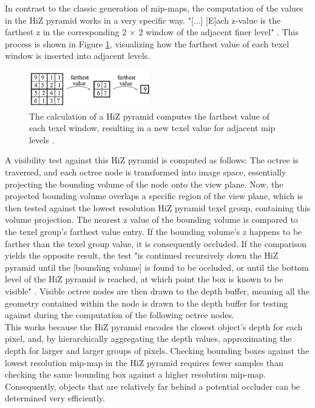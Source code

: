 \noindent
In contrast to the classic generation of mip-maps, the computation of the values in the \ac{HiZ} pyramid works in a 
very specific way. "[...] [E]ach z-value is the farthest z in the corresponding 2 \begin{math}\times\end{math} 2 window 
of the adjacent finer level" \cite{AkenineMoeller2018}. This process is shown in Figure \ref{fig:hiz-value-computation}, 
visualizing how the farthest value of each texel window is inserted into adjacent levels.\\
\enlargethispage{\baselineskip}

\begin{figure}[h]
    \centering
    \includegraphics[width=200px]{images/graphics/hiz-buf-values.jpg}
    \caption{The calculation of a \ac{HiZ} pyramid computes the farthest value of each texel window, 
    resulting in a new texel value for adjacent mip levels \cite{AkenineMoeller2018}.}
    \label{fig:hiz-value-computation}
\end{figure}

\noindent
A visibility test against this \ac{HiZ} pyramid is computed as follows: The octree is traversed, and each octree node 
is transformed into image space, essentially projecting the bounding volume of the node onto the view plane. Now, 
the projected bounding volume overlaps a specific region of the view plane, which is then tested against the lowest 
resolution \ac{HiZ} pyramid texel group, containing this volume projection. The nearest z value of the bounding volume is 
compared to the texel group's farthest value entry. If the bounding volume's z happens to be farther than the 
texel group value, it is consequently occluded. If the comparison yields the opposite result, the test "is continued 
recursively down the \ac{HiZ} pyramid until the [bounding volume] is found to be occluded, or until the bottom level of the 
\ac{HiZ} pyramid is reached, at which point the box is known to be visible" \cite{AkenineMoeller2018}. Visible octree nodes 
are then drawn to the depth buffer, meaning all the geometry contained within the node is drawn to the depth buffer 
for testing against during the computation of the following octree nodes.\\

\noindent
This works because the \ac{HiZ} pyramid encodes the closest object's depth for each pixel, and, by hierarchically 
aggregating the depth values, approximating the depth for larger and larger groups of pixels. Checking bounding boxes 
against the lowest resolution mip-map in the \ac{HiZ} pyramid requires fewer samples than checking the same bounding 
box against a higher resolution mip-map. Consequently, objects that are relatively far behind a potential occluder 
can be determined very efficiently. \\


